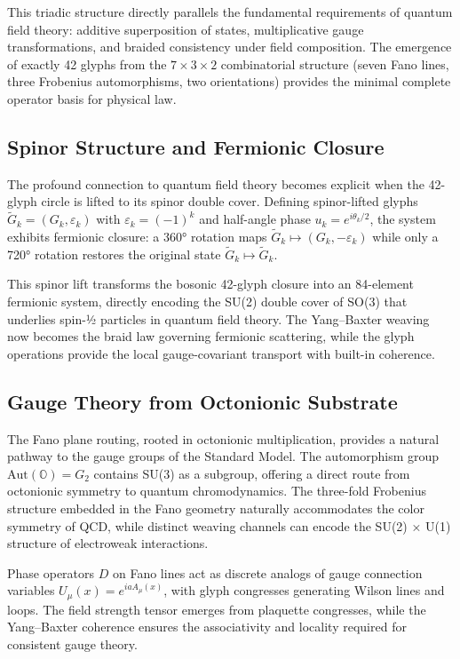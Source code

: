 \documentclass[pdflatex,sn-mathphys-num]{sn-jnl}
\theoremstyle{thmstyleone}
\theoremstyle{thmstyletwo}
\theoremstyle{thmstylethree}
\begin{document}
This triadic structure directly parallels the fundamental requirements of quantum field theory: additive superposition of states, multiplicative gauge transformations, and braided consistency under field composition. The emergence of exactly 42 glyphs from the $7 \times 3 \times 2$ combinatorial structure (seven Fano lines, three Frobenius automorphisms, two orientations) provides the minimal complete operator basis for physical law.

\subsection{Spinor Structure and Fermionic Closure}

The profound connection to quantum field theory becomes explicit when the 42-glyph circle is lifted to its spinor double cover. Defining spinor-lifted glyphs $\tilde{G}_k = (G_k, \varepsilon_k)$ with $\varepsilon_k = (-1)^k$ and half-angle phase $u_k = e^{i\theta_k/2}$, the system exhibits fermionic closure: a 360° rotation maps $\tilde{G}_k \mapsto (G_k, -\varepsilon_k)$ while only a 720° rotation restores the original state $\tilde{G}_k \mapsto \tilde{G}_k$.

This spinor lift transforms the bosonic 42-glyph closure into an 84-element fermionic system, directly encoding the SU(2) double cover of SO(3) that underlies spin-½ particles in quantum field theory. The Yang--Baxter weaving now becomes the braid law governing fermionic scattering, while the glyph operations provide the local gauge-covariant transport with built-in coherence.

\subsection{Gauge Theory from Octonionic Substrate}

The Fano plane routing, rooted in octonionic multiplication, provides a natural pathway to the gauge groups of the Standard Model. The automorphism group $\text{Aut}(\mathbb{O}) = G_2$ contains SU(3) as a subgroup, offering a direct route from octonionic symmetry to quantum chromodynamics. The three-fold Frobenius structure embedded in the Fano geometry naturally accommodates the color symmetry of QCD, while distinct weaving channels can encode the SU(2) × U(1) structure of electroweak interactions.

Phase operators $D$ on Fano lines act as discrete analogs of gauge connection variables $U_\mu(x) = e^{iaA_\mu(x)}$, with glyph congresses generating Wilson lines and loops. The field strength tensor emerges from plaquette congresses, while the Yang--Baxter coherence ensures the associativity and locality required for consistent gauge theory.
\end{document}
